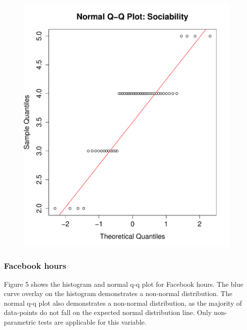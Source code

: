 \begin{figure}[H]
\includegraphics[scale=0.35]{./img/qqplot_sociability.pdf}
\end{figure}

\subsubsection{Facebook hours}

Figure 5 shows the histogram and normal q-q plot for Facebook hours. The blue curve overlay on the histogram demonstrates a non-normal distribution. The normal q-q plot also demonstrates a non-normal distribution, as the majority of data-points do not fall on the expected normal distribution line. Only non-parametric tests are applicable for this variable.

